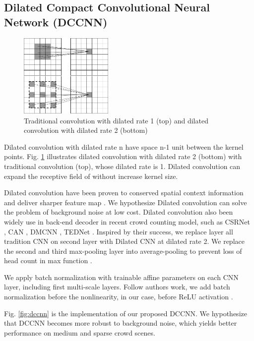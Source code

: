 \subsection{Dilated Compact Convolutional Neural Network (DCCNN)} 

\begin{figure}[htbp]
\centerline{\includegraphics[width=0.4\textwidth]{Picture/example/cnn_vs_dilated_cnn.png}}
\caption{Traditional convolution with dilated rate 1 (top) and dilated convolution with dilated rate 2 (bottom)}
\label{fig:cnn_vs_dilated}
\end{figure}

Dilated convolution with dilated rate n have space n-1 unit between the kernel points. Fig. \ref{fig:cnn_vs_dilated} illustrates dilated convolution with dilated rate 2 (bottom) with traditional convolution (top), whose dilated rate is 1. Dilated convolution can expand the receptive field of without increase kernel size.

Dilated convolution have been proven to conserved spatial context information  and deliver sharper feature map \cite{li2018csrnet}. We hypothesize Dilated convolution can solve the problem of background noise at low cost. Dilated convolution also been widely use in back-end decoder in recent crowd counting model, such as CSRNet \cite{li2018csrnet}, CAN \cite{liu2019context}, DMCNN \cite{zhang2019crowd}, TEDNet \cite{jiang2019crowd}. Inspired by their success, we replace layer all tradition CNN on second layer with Dilated CNN at dilated rate 2. We replace the second and third max-pooling layer into average-pooling to prevent loss of head count in max function \cite{zhang2019crowd}. 

We apply batch normalization \cite{ioffe2015batch} with trainable affine parameters on each CNN layer, including first multi-scale layers. Follow authors work, we add batch normalization before the nonlinearity, in our case, before ReLU activation \cite{agarap2018deep}. 

Fig. \ref{fig:dccnn} is the implementation of our proposed DCCNN.  We hypothesize that DCCNN becomes more robust to background noise, which yields better performance on medium and sparse crowd scenes. 

